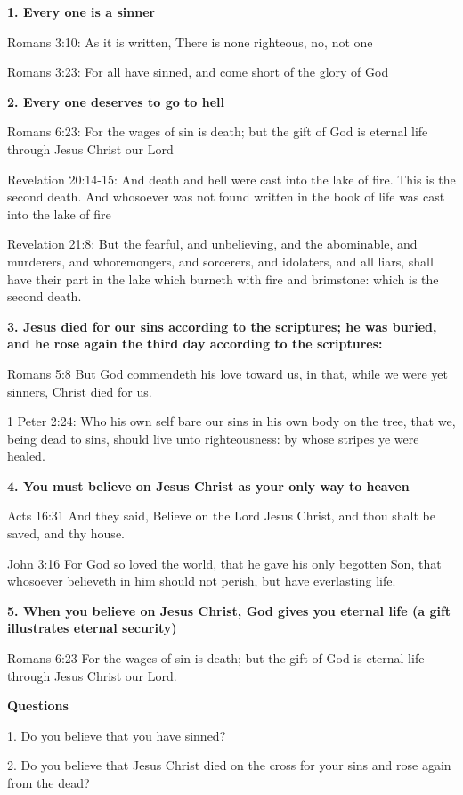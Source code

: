 \textbf{1. Every one is a sinner}

Romans 3:10: As it is written, There is none righteous, no, not one

Romans 3:23: For all have sinned, and come short of the glory of God


\textbf{2. Every one deserves to go to hell}

Romans 6:23: For the wages of sin is death; but the gift of God is eternal life through Jesus Christ our Lord

Revelation 20:14-15:  And death and hell were cast into the lake of fire. This is the second death.  And whosoever was not found written in the book of life was cast into the lake of fire

Revelation 21:8:  But the fearful, and unbelieving, and the abominable, and murderers, and whoremongers, and sorcerers, and idolaters, and all liars, shall have their part in the lake which burneth with fire and brimstone: which is the second death.


\textbf{3. Jesus died for our sins according to the scriptures; he was buried, and he rose again the third day according to the scriptures:}

Romans 5:8 But God commendeth his love toward us, in that, while we were yet sinners, Christ died for us.

1 Peter 2:24: Who his own self bare our sins in his own body on the tree, that we, being dead to sins, should live unto righteousness: by whose stripes ye were healed.


\textbf{4. You must believe on Jesus Christ as your only way to heaven}

Acts 16:31  And they said, Believe on the Lord Jesus Christ, and thou shalt be saved, and thy house.

John 3:16  For God so loved the world, that he gave his only begotten Son, that whosoever believeth in him should not perish, but have everlasting life.


\textbf{5. When you believe on Jesus Christ, God gives you eternal life (a gift illustrates eternal security)}

Romans 6:23  For the wages of sin is death; but the gift of God is eternal life through Jesus Christ our Lord.


\textbf{Questions}

  1. Do you believe that you have sinned?

  2. Do you believe that Jesus Christ died on the cross for your sins and rose again from the dead?

